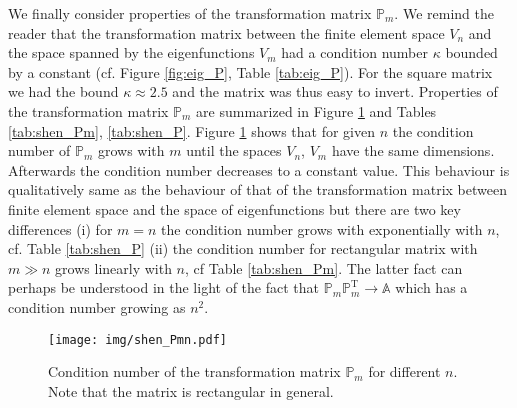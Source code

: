 \documentclass[a4paper,10pt]{article}
\newcommand{\Amat}{\ensuremath{\mathbb{A}}}
\newcommand{\Pmat}{\ensuremath{\mathbb{P}_m}}                  %
\newcommand{\Pmatt}{\ensuremath{\mathbb{P}_m^{\text{T}}}}       %
\begin{document}
  We finally consider properties of the transformation matrix $\Pmat$. We remind
  the reader that the transformation matrix between the finite element space
  $V_n$ and the space spanned by the eigenfunctions $V_m$ had a condition number
  $\kappa$ bounded by a constant (cf. Figure \ref{fig:eig_P}, Table
  \ref{tab:eig_P}). For the square matrix we had the bound $\kappa\approx 2.5$
  and the matrix was thus easy to invert. Properties of the transformation
  matrix $\Pmat$ are summarized in Figure \ref{fig:shen_P} and
  Tables \ref{tab:shen_Pm}, \ref{tab:shen_P}. Figure \ref{fig:shen_P} shows
  that for given $n$ the condition number of $\Pmat$ grows with $m$ until the
  spaces $V_n$, $V_m$ have the same dimensions. Afterwards the condition number
  decreases to a constant value. This behaviour is qualitatively same as the
  behaviour of that of the transformation matrix between finite element space
  and the space of eigenfunctions but there are two key differences (i) for
  $m=n$ the condition number grows with exponentially with $n$, cf.
  Table \ref{tab:shen_P} (ii) the
  condition number for rectangular matrix with $m \gg n$ grows linearly with
  $n$, cf Table \ref{tab:shen_Pm}. The latter fact can perhaps be understood in
  the light of the fact that $\Pmat\Pmatt\rightarrow\Amat$ which has a condition
  number growing as $n^2$.

  \begin{figure}
  \begin{center}
    \texttt{[image: img/shen\_Pmn.pdf]}
  \end{center}
  \label{fig:shen_P}
  \caption{Condition number of the transformation matrix $\Pmat$ for different $n$.
    Note that the matrix is rectangular in general.}
  \end{figure}
\end{document}
